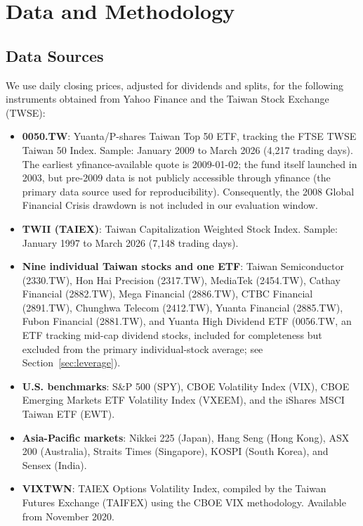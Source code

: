 
\section{Data and Methodology}
\label{sec:data}

\subsection{Data Sources}

We use daily closing prices, adjusted for dividends and splits, for the following instruments obtained from Yahoo Finance and the Taiwan Stock Exchange (TWSE):

\begin{itemize}
    \item \textbf{0050.TW}: Yuanta/P-shares Taiwan Top 50 ETF, tracking the FTSE TWSE Taiwan 50 Index. Sample: January 2009 to March 2026 (4,217 trading days). The earliest yfinance-available quote is 2009-01-02; the fund itself launched in 2003, but pre-2009 data is not publicly accessible through yfinance (the primary data source used for reproducibility). Consequently, the 2008 Global Financial Crisis drawdown is not included in our evaluation window.
    \item \textbf{TWII (TAIEX)}: Taiwan Capitalization Weighted Stock Index. Sample: January 1997 to March 2026 (7,148 trading days).
    \item \textbf{Nine individual Taiwan stocks and one ETF}: Taiwan Semiconductor (2330.TW), Hon Hai Precision (2317.TW), MediaTek (2454.TW), Cathay Financial (2882.TW), Mega Financial (2886.TW), CTBC Financial (2891.TW), Chunghwa Telecom (2412.TW), Yuanta Financial (2885.TW), Fubon Financial (2881.TW), and Yuanta High Dividend ETF (0056.TW, an ETF tracking mid-cap dividend stocks, included for completeness but excluded from the primary individual-stock average; see Section~\ref{sec:leverage}).
    \item \textbf{U.S. benchmarks}: S\&P 500 (SPY), CBOE Volatility Index (VIX), CBOE Emerging Markets ETF Volatility Index (VXEEM), and the iShares MSCI Taiwan ETF (EWT).
    \item \textbf{Asia-Pacific markets}: Nikkei 225 (Japan), Hang Seng (Hong Kong), ASX 200 (Australia), Straits Times (Singapore), KOSPI (South Korea), and Sensex (India).
    \item \textbf{VIXTWN}: TAIEX Options Volatility Index, compiled by the Taiwan Futures Exchange (TAIFEX) using the CBOE VIX methodology. Available from November 2020.
\end{itemize}

